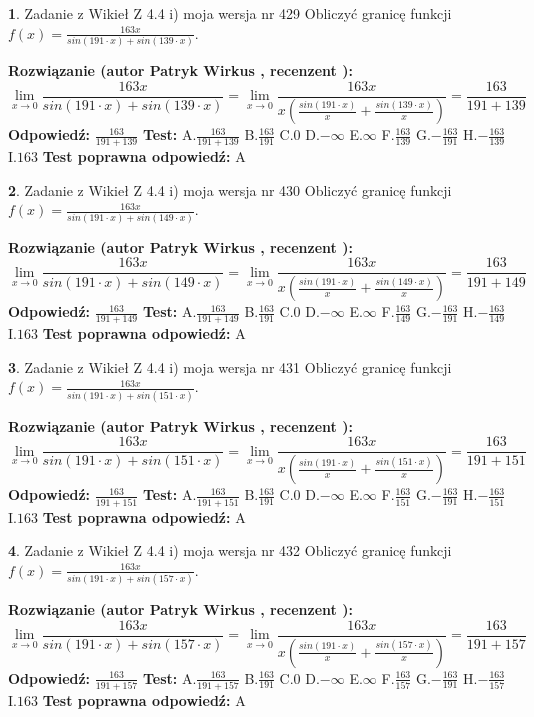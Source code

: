 \documentclass[12pt, a4paper]{article}
\theoremstyle{definition} %
\newtheorem{zad}{}
\newcommand{\zadStart}[1]{\begin{zad}#1\newline}
\newcommand{\zadStop}{\end{zad}}
\newcommand{\rozwStart}[2]{\noindent \textbf{Rozwiązanie (autor #1 , recenzent #2): }\newline}
\newcommand{\rozwStop}{\newline}
\newcommand{\odpStart}{\noindent \textbf{Odpowiedź:}\newline}
\newcommand{\odpStop}{\newline}
\newcommand{\testStart}{\noindent \textbf{Test:}\newline}
\newcommand{\testStop}{\newline}
\newcommand{\kluczStart}{\noindent \textbf{Test poprawna odpowiedź:}\newline}
\newcommand{\kluczStop}{\newline}
\begin{document}
\zadStart{Zadanie z Wikieł Z 4.4 i) moja wersja nr 429}
Obliczyć granicę funkcji $f(x)=\frac{163x}{sin(191\cdot x) +sin(139\cdot x)}$.
\zadStop
\rozwStart{Patryk Wirkus}{}
$$\lim\limits_{x\to 0}\frac{163x}{sin(191\cdot x) +sin(139\cdot x)}=\lim\limits_{x\to 0}\frac{163x}{x(\frac{sin(191\cdot x)}{x}+\frac{sin(139\cdot x)}{x})}=\frac{163}{191+139}$$
\rozwStop
\odpStart
$\frac{163}{191+139}$
\odpStop
\testStart
A.$\frac{163}{191+139}$
B.$\frac{163}{191}$
C.$0$
D.$-\infty$
E.$\infty$
F.$\frac{163}{139}$
G.$-\frac{163}{191}$
H.$-\frac{163}{139}$
I.$163$
\testStop
\kluczStart
A
\kluczStop



\zadStart{Zadanie z Wikieł Z 4.4 i) moja wersja nr 430}
Obliczyć granicę funkcji $f(x)=\frac{163x}{sin(191\cdot x) +sin(149\cdot x)}$.
\zadStop
\rozwStart{Patryk Wirkus}{}
$$\lim\limits_{x\to 0}\frac{163x}{sin(191\cdot x) +sin(149\cdot x)}=\lim\limits_{x\to 0}\frac{163x}{x(\frac{sin(191\cdot x)}{x}+\frac{sin(149\cdot x)}{x})}=\frac{163}{191+149}$$
\rozwStop
\odpStart
$\frac{163}{191+149}$
\odpStop
\testStart
A.$\frac{163}{191+149}$
B.$\frac{163}{191}$
C.$0$
D.$-\infty$
E.$\infty$
F.$\frac{163}{149}$
G.$-\frac{163}{191}$
H.$-\frac{163}{149}$
I.$163$
\testStop
\kluczStart
A
\kluczStop



\zadStart{Zadanie z Wikieł Z 4.4 i) moja wersja nr 431}
Obliczyć granicę funkcji $f(x)=\frac{163x}{sin(191\cdot x) +sin(151\cdot x)}$.
\zadStop
\rozwStart{Patryk Wirkus}{}
$$\lim\limits_{x\to 0}\frac{163x}{sin(191\cdot x) +sin(151\cdot x)}=\lim\limits_{x\to 0}\frac{163x}{x(\frac{sin(191\cdot x)}{x}+\frac{sin(151\cdot x)}{x})}=\frac{163}{191+151}$$
\rozwStop
\odpStart
$\frac{163}{191+151}$
\odpStop
\testStart
A.$\frac{163}{191+151}$
B.$\frac{163}{191}$
C.$0$
D.$-\infty$
E.$\infty$
F.$\frac{163}{151}$
G.$-\frac{163}{191}$
H.$-\frac{163}{151}$
I.$163$
\testStop
\kluczStart
A
\kluczStop



\zadStart{Zadanie z Wikieł Z 4.4 i) moja wersja nr 432}
Obliczyć granicę funkcji $f(x)=\frac{163x}{sin(191\cdot x) +sin(157\cdot x)}$.
\zadStop
\rozwStart{Patryk Wirkus}{}
$$\lim\limits_{x\to 0}\frac{163x}{sin(191\cdot x) +sin(157\cdot x)}=\lim\limits_{x\to 0}\frac{163x}{x(\frac{sin(191\cdot x)}{x}+\frac{sin(157\cdot x)}{x})}=\frac{163}{191+157}$$
\rozwStop
\odpStart
$\frac{163}{191+157}$
\odpStop
\testStart
A.$\frac{163}{191+157}$
B.$\frac{163}{191}$
C.$0$
D.$-\infty$
E.$\infty$
F.$\frac{163}{157}$
G.$-\frac{163}{191}$
H.$-\frac{163}{157}$
I.$163$
\testStop
\kluczStart
A
\kluczStop
\end{document}

